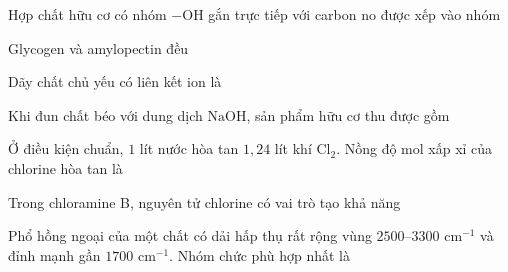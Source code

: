 \begin{ex}
Hợp chất hữu cơ có nhóm $-\mathrm{OH}$ gắn trực tiếp với carbon no được xếp vào nhóm
\end{ex}

\begin{ex}
Glycogen và amylopectin đều
\end{ex}

\begin{ex}
Dãy chất chủ yếu có liên kết ion là
\end{ex}

\begin{ex}
Khi đun chất béo với dung dịch $\mathrm{NaOH}$, sản phẩm hữu cơ thu được gồm
\end{ex}

\begin{ex}
Ở điều kiện chuẩn, $1$ lít nước hòa tan $1{,}24$ lít khí $\mathrm{Cl_2}$. Nồng độ mol xấp xỉ của chlorine hòa tan là
\end{ex}

\begin{ex}
Trong chloramine B, nguyên tử chlorine có vai trò tạo khả năng
\end{ex}

\begin{ex}
Phổ hồng ngoại của một chất có dải hấp thụ rất rộng vùng $2500$--$3300$ cm$^{-1}$ và đỉnh mạnh gần $1700$ cm$^{-1}$. Nhóm chức phù hợp nhất là
\end{ex}

